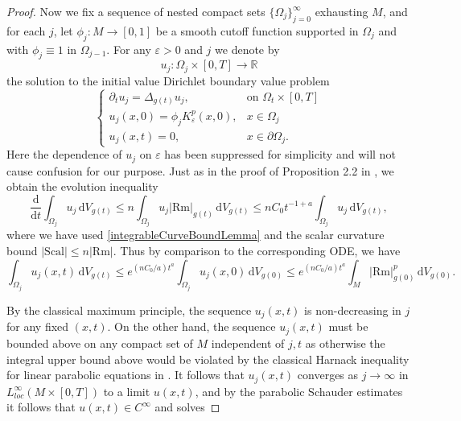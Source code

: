 \documentclass[10pt,a4paper]{amsart}
\newcommand{\Rm}{\mathrm{Rm}}
\newcommand{\dV}{\mathrm{d}V}
\begin{document}
\begin{proof}
Now we fix a sequence of nested compact sets $\{\Omega_j\}_{j=0}^\infty$ exhausting $M$, and for each $j$, let $\phi_j: M \to [0,1]$ be a smooth cutoff function  supported in $\Omega_j$ and with $\phi_j \equiv 1$ in $\Omega_{j-1}$. For any $\varepsilon > 0$ and $j$ we denote by 
\[
u_{j} : \Omega_j \times [0,T] \to \mathbb{R}
\] 
the solution to the initial value Dirichlet boundary value problem
\[
\begin{cases}
\partial_t u_{j} = \Delta_{g(t)} u_{j}, & \text{on }  \Omega_t\times[0, T] \\
u_{j}(x,0) = \phi_j K_{\varepsilon}^p(x,0), & x \in \Omega_j\\
u_{j}(x,t) = 0, & x \in \partial \Omega_j.
\end{cases}
\]
Here the dependence of $u_j$ on $\varepsilon$ has been suppressed for simplicity and will not cause confusion for our purpose.  Just as in the proof of Proposition 2.2 in \cite{ChauMartens}, we obtain the evolution inequality
\[
\frac{\mathrm{d}}{\mathrm{d}t}\int_{\Omega_j} u_{j} \,\dV_{g(t)} \le n\int_{\Omega_j} u_{j}|\mathrm{Rm}|_{g(t)} \,\dV_{g(t)}\le nC_0 t^{-1+a} \int_{\Omega_j} u_{j} \,\dV_{g(t)},
\]
where we have used \eqref{integrableCurveBoundLemma} and the scalar curvature bound $|\mathrm{Scal}|\leq n|\Rm|$. Thus by comparison to the corresponding ODE, we have
\[
\int_{\Omega_j} u_{j}(x, t) \,\dV_{g(t)}\leq e^{(nC_0/a)t^{a}}\int_{\Omega_j} u_{j}(x, 0) \,\dV_{g(0)} \le e^{(nC_0/a)t^{a}}\int_{M} |\mathrm{Rm}|_{g(0)}^p  \,\dV_{g(0)} .
\]

By the classical maximum principle, the sequence $u_j (x, t)$ is non-decreasing in $j$ for any fixed $(x, t)$.  On the other hand, the sequence $u_j(x, t)$ must be bounded above on any compact set of $M$ independent of $j, t$ as otherwise the integral upper bound above would be violated by the classical Harnack inequality for linear parabolic equations in \cite{KrylovSafanov}.  It follows that $u_j(x, t)$ converges as $j\to \infty$ in $L^{\infty}_{loc}(M\times[0, T])$ to a limit $u(x, t)$, and by the parabolic Schauder estimates it follows that $u(x, t)\in C^{\infty}$ and solves


\end{proof}
\end{document}
